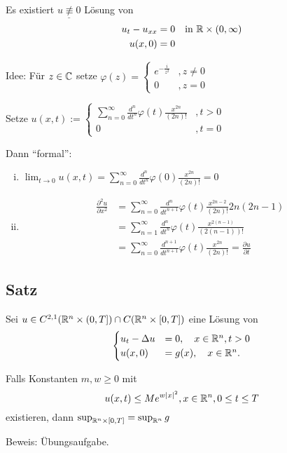Es existiert $\underline{u \not\equiv 0}$ Lösung von
\begin{align*}
  u_t - u_{xx} &= 0 \quad\text{in } \mathbb{R} \times (0, \infty) \\
  u(x, 0) &= 0
\end{align*}

Idee: Für $z \in \mathbb{C}$ setze $\varphi(z) = \begin{cases} e^{-\frac{i}{z^2}} &, z \neq 0 \\  0 &, z = 0 \end{cases}$

Setze $u(x, t) := \begin{cases} \sum_{n = 0}^\infty \frac{d^n}{dt^n} \varphi(t) \frac{x^{2n}}{(2n)!} &, t > 0 \\
  0 &, t = 0 \end{cases}$

Dann ``formal'':
\begin{enumerate}[(i)]
  \item $\lim_{t \to 0} u(x, t) = \sum_{n = 0}^\infty \frac{d^n}{dt^n} \varphi(0) \frac{x^{2n}}{(2n)!} = 0$
  \item 
    \begin{align*} 
      \frac{\partial^2u}{\partial x^2} 
      &= \sum_{n = 0}^\infty \frac{d^n}{dt^{n + 1}} \varphi(t) \frac{x^{2n - 2}}{(2n)!} 2n(2n - 1) \\
      &= \sum_{n = 1}^\infty \frac{d^n}{dt^n} \varphi(t) \frac{x^{2(n - 1)}}{(2(n - 1))!} \\
      &= \sum_{n = 0}^\infty \frac{d^{n+1}}{dt^{n+1}} \varphi(t) \frac{x^{2n}}{(2n)!} = \frac{\partial u}{\partial t}
    \end{align*}
\end{enumerate}

\subsection{Satz}

Sei $u \in C^{2,1}(\mathbb{R}^n \times (0, T]) \cap C(\mathbb{R}^n \times [0, T])$ eine Lösung von 
$$
\begin{cases}
  u_t - \Delta u &= 0, \quad x \in \mathbb{R}^n, t > 0 \\
  u(x, 0) &= g(x), \quad x \in \mathbb{R}^n.
\end{cases}
$$

Falls Konstanten $m, w \geq 0$ mit
$$
u(x, t) \leq M e^{w |x|^2}, x \in \mathbb{R}^n, 0 \leq t \leq T
$$
existieren, dann $\sup_{\mathbb{R}^n \times [0, T]} = \sup_{\mathbb{R}^n} g$

Beweis: Übungsaufgabe.

